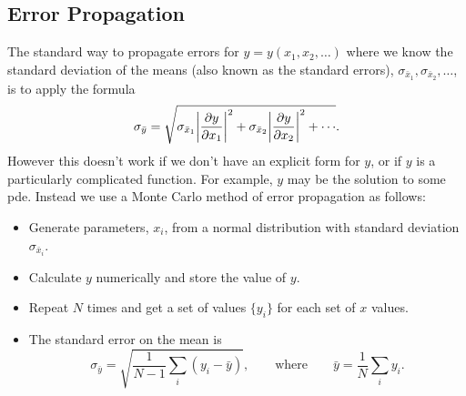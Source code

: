 \documentclass[a4paper]{article}
\begin{document}
    \subsection{Error Propagation}
    The standard way to propagate errors for \(y = y(x_1, x_2, \dotsc)\) where we know the standard deviation of the means (also known as the standard errors), \(\sigma_{\bar{x}_1}, \sigma_{\bar{x}_2}, \dotsc\), is to apply the formula
    \[\sigma_{\bar{y}} = \sqrt{\sigma_{\bar{x}_1}\abs{\pdv{y}{x_1}}^2 + \sigma_{\bar{x}_2}\abs{\pdv{y}{x_2}}^2 + \dotsb}.\]
    However this doesn't work if we don't have an explicit form for \(y\), or if \(y\) is a particularly complicated function.
    For example, \(y\) may be the solution to some \gls{pde}.
    Instead we use a Monte Carlo method of error propagation as follows:
    \begin{itemize}
        \item Generate parameters, \(x_i\), from a normal distribution with standard deviation \(\sigma_{\bar{x}_i}\).
        \item Calculate \(y\) numerically and store the value of \(y\).
        \item Repeat \(N\) times and get a set of values \(\{y_i\}\) for each set of \(x\) values.
        \item The standard error on the mean is
        \[\sigma_{\bar{y}} = \sqrt{\frac{1}{N - 1} \sum_{i}(y_i - \bar{y})},\qquad\text{where}\qquad \bar{y} = \frac{1}{N}\sum_i y_i.\]
    \end{itemize}
    
\end{document}
